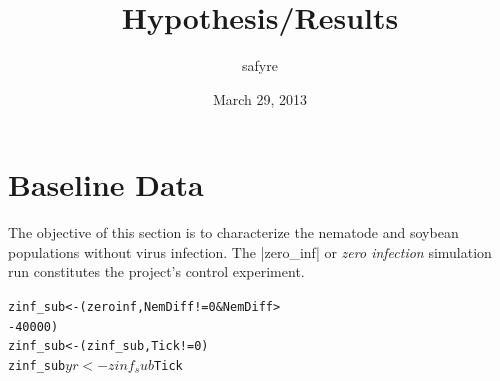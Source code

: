 \documentclass[11pt]{article}
\title{Hypothesis/Results}
\date{March 29, 2013}
\author{safyre}
\begin{document}
\maketitle

\section{Baseline Data}

The objective of this section is to characterize the nematode and soybean populations without virus infection.  The |zero_inf| or \emph{zero infection} simulation run constitutes the project's control experiment.







\begin{knitrout}
\color{fgcolor}\begin{kframe}
\begin{alltt}
zinf_sub <- (zeroinf, NemDiff != 0 & NemDiff > 
    -40000)
zinf_sub <- (zinf_sub, Tick != 0)
zinf_sub$yr <- zinf_sub$Tick%
\end{alltt}
\end{kframe}
\end{knitrout}
\end{document}
